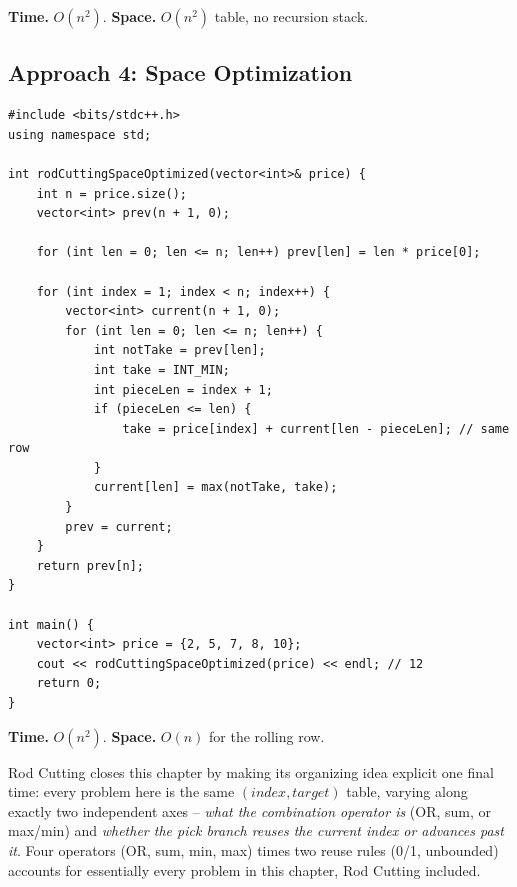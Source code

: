\begin{complexitybox}
\textbf{Time.} $O(n^2)$.
\textbf{Space.} $O(n^2)$ table, no recursion stack.
\end{complexitybox}

\subsection*{Approach 4: Space Optimization}

\begin{lstlisting}
#include <bits/stdc++.h>
using namespace std;

int rodCuttingSpaceOptimized(vector<int>& price) {
    int n = price.size();
    vector<int> prev(n + 1, 0);

    for (int len = 0; len <= n; len++) prev[len] = len * price[0];

    for (int index = 1; index < n; index++) {
        vector<int> current(n + 1, 0);
        for (int len = 0; len <= n; len++) {
            int notTake = prev[len];
            int take = INT_MIN;
            int pieceLen = index + 1;
            if (pieceLen <= len) {
                take = price[index] + current[len - pieceLen]; // same row
            }
            current[len] = max(notTake, take);
        }
        prev = current;
    }
    return prev[n];
}

int main() {
    vector<int> price = {2, 5, 7, 8, 10};
    cout << rodCuttingSpaceOptimized(price) << endl; // 12
    return 0;
}
\end{lstlisting}

\begin{complexitybox}
\textbf{Time.} $O(n^2)$.
\textbf{Space.} $O(n)$ for the rolling row.
\end{complexitybox}

\begin{takeawaybox}
Rod Cutting closes this chapter by making its organizing idea explicit
one final time: every problem here is the same $(\textit{index},
\textit{target})$ table, varying along exactly two independent axes --
\emph{what the combination operator is} (OR, sum, or max/min) and
\emph{whether the pick branch reuses the current index or advances past
it}. Four operators (OR, sum, min, max) times two reuse rules (0/1,
unbounded) accounts for essentially every problem in this chapter, Rod
Cutting included.
\end{takeawaybox}
